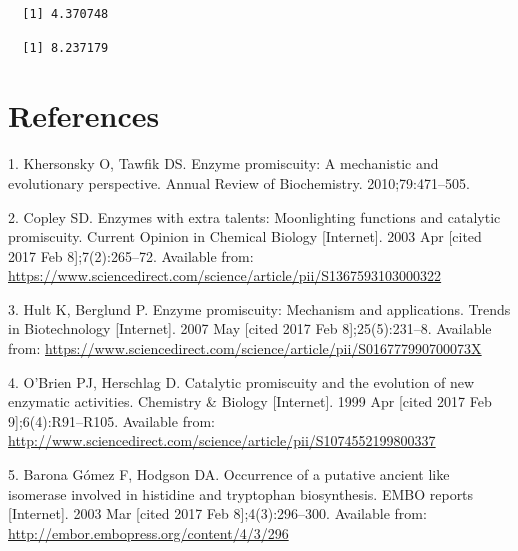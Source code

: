 \documentclass[12pt,twoside]{reedthesis}
\begin{document}
{  \begin{verbatim}
  [1] 4.370748
  \end{verbatim}
  
  \begin{Shaded}
  \begin{Highlighting}[]
  \NormalTok{(}
  \end{Highlighting}
  \end{Shaded}
  
  \begin{verbatim}
  [1] 8.237179
  \end{verbatim}
  
  \backmatter
  
  \chapter{References}\label{references}
  
  \noindent
  
  \setlength{\parindent}{-0.20in} \setlength{\leftskip}{0.20in}
  \setlength{\parskip}{8pt}
  
  \hypertarget{refs}{}
  \hypertarget{ref-khersonsky_enzyme_2010}{}
  1. Khersonsky O, Tawfik DS. Enzyme promiscuity: A mechanistic and
  evolutionary perspective. Annual Review of Biochemistry.
  2010;79:471--505.
  
  \hypertarget{ref-copley_enzymes_2003}{}
  2. Copley SD. Enzymes with extra talents: Moonlighting functions and
  catalytic promiscuity. Current Opinion in Chemical Biology
  {[}Internet{]}. 2003 Apr {[}cited 2017 Feb 8{]};7(2):265--72. Available
  from:
  \url{https://www.sciencedirect.com/science/article/pii/S1367593103000322}
  
  \hypertarget{ref-hult_enzyme_2007}{}
  3. Hult K, Berglund P. Enzyme promiscuity: Mechanism and applications.
  Trends in Biotechnology {[}Internet{]}. 2007 May {[}cited 2017 Feb
  8{]};25(5):231--8. Available from:
  \url{https://www.sciencedirect.com/science/article/pii/S016777990700073X}
  
  \hypertarget{ref-obrien_catalytic_1999}{}
  4. O'Brien PJ, Herschlag D. Catalytic promiscuity and the evolution of
  new enzymatic activities. Chemistry \& Biology {[}Internet{]}. 1999 Apr
  {[}cited 2017 Feb 9{]};6(4):R91--R105. Available from:
  \url{http://www.sciencedirect.com/science/article/pii/S1074552199800337}
  
  \hypertarget{ref-baronagomez_occurrence_2003}{}
  5. Barona Gómez F, Hodgson DA. Occurrence of a putative ancient like
  isomerase involved in histidine and tryptophan biosynthesis. EMBO
  reports {[}Internet{]}. 2003 Mar {[}cited 2017 Feb 8{]};4(3):296--300.
  Available from: \url{http://embor.embopress.org/content/4/3/296}
  
}
\end{document}

